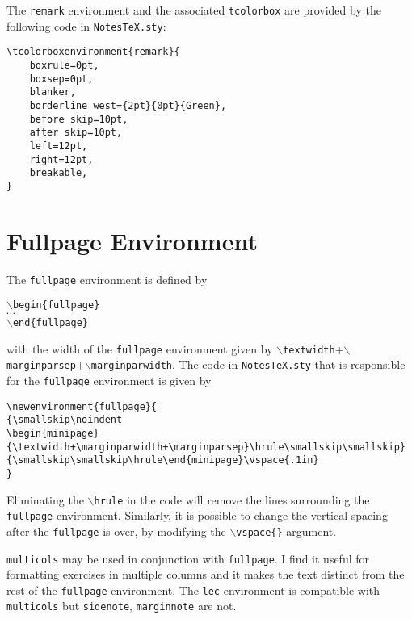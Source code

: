 \documentclass[10pt]{article}
\begin{document}
	\begin{remark}
		The \texttt{remark} environment and the associated \texttt{tcolorbox} are provided by the following code in \texttt{NotesTeX.sty}:
		\begin{lstlisting}[language={[LaTeX]TeX},style=standalone]
\tcolorboxenvironment{remark}{
	boxrule=0pt,
	boxsep=0pt,
	blanker,
	borderline west={2pt}{0pt}{Green},
	before skip=10pt,
	after skip=10pt,
	left=12pt,
	right=12pt,
	breakable,
}
		\end{lstlisting}
	\end{remark}

	\section{Fullpage Environment}\label{Sec: Fullpage}
	\begin{fullpage}
		The \texttt{fullpage} environment is defined by
		\begin{center}
			\texttt{$\backslash$begin\{fullpage\}}\\
			$\cdots$\\
			\texttt{$\backslash$end\{fullpage\}}
		\end{center}
		with the width of the \texttt{fullpage} environment given by \texttt{$\backslash$textwidth}+\texttt{$\backslash$marginparsep}+\texttt{$\backslash$marginparwidth}. The code in \texttt{NotesTeX.sty} that is responsible for the \texttt{fullpage} environment is given by
		\begin{lstlisting}
\newenvironment{fullpage}{
{\smallskip\noindent
\begin{minipage}{\textwidth+\marginparwidth+\marginparsep}\hrule\smallskip\smallskip}
{\smallskip\smallskip\hrule\end{minipage}\vspace{.1in}
}
		\end{lstlisting}
	\end{fullpage}
	\begin{remark}
		Eliminating the \texttt{$\backslash$hrule} in the code will remove the lines surrounding the \texttt{fullpage} environment. Similarly, it is possible to change the vertical spacing after the \texttt{fullpage} is over, by modifying the \texttt{$\backslash$vspace\{\}} argument.
	\end{remark}

	\begin{fullpage}
		\begin{multicols}{2}
		\texttt{multicols}  may be used in conjunction with \texttt{fullpage}. I find it useful for formatting exercises in multiple columns and it makes the text distinct from the rest of the \texttt{fullpage} environment. The \texttt{lec} environment is compatible with \texttt{multicols} but \texttt{sidenote}, \texttt{marginnote} are not.\\

		\end{multicols}
	\end{fullpage}
\end{document}
